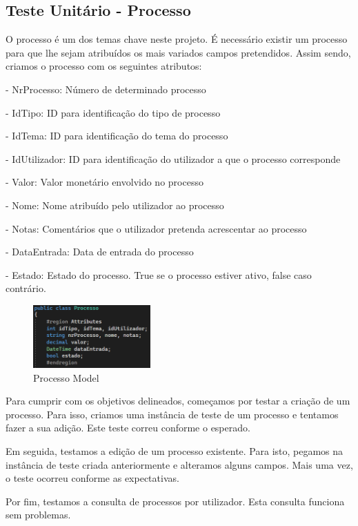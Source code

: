 \subsection{Teste Unitário - Processo}
\indent \par O processo é um dos temas chave neste projeto. É necessário existir um processo para que lhe sejam atribuídos os mais variados campos pretendidos.
Assim sendo, criamos o processo com os seguintes atributos:
\indent \par - NrProcesso: Número de determinado processo
\indent \par - IdTipo: ID para identificação do tipo de processo
\indent \par - IdTema: ID para identificação do tema do processo
\indent \par - IdUtilizador: ID para identificação do utilizador a que o processo corresponde
\indent \par - Valor: Valor monetário envolvido no processo
\indent \par - Nome: Nome atribuído pelo utilizador ao processo
\indent \par - Notas: Comentários que o utilizador pretenda acrescentar ao processo
\indent \par - DataEntrada: Data de entrada do processo
\indent \par - Estado: Estado do processo. True se o processo estiver ativo, false caso contrário.

\begin{figure}[!h]
\centering
\includegraphics[width=0.4\textwidth]{Figuras/Models/ProcessoModel.png}
\caption{Processo Model}
\label{d.model}
\end{figure}

\indent \par Para cumprir com os objetivos delineados, começamos por testar a criação de um processo. Para isso, criamos uma instância de teste de um processo e tentamos fazer a sua adição. Este teste correu conforme o esperado.
\indent \par Em seguida, testamos a edição de um processo existente. Para isto, pegamos na instância de teste criada anteriormente e alteramos alguns campos. Mais uma vez, o teste ocorreu conforme as expectativas.
\indent \par Por fim, testamos a consulta de processos por utilizador. Esta consulta funciona sem problemas.

